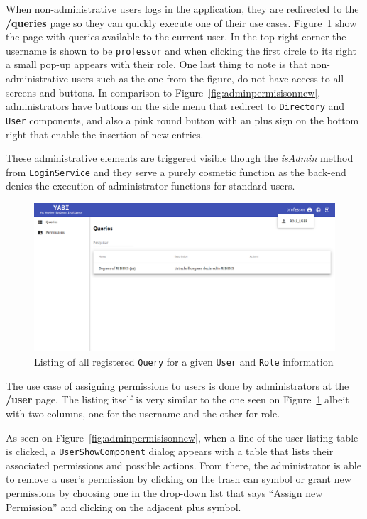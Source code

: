 When non-administrative users logs in the application, they are redirected to the \textbf{/queries} page so they can quickly execute one of their use cases. Figure~\ref{fig:userquerylist} show the page with queries available to the current user. In the top right corner the username is shown to be \texttt{professor} and when clicking the first circle to its right a small pop-up appears with their role. One last thing to note is that non-administrative users such as the one from the figure, do not have access to all screens and buttons. In comparison to Figure~\ref{fig:adminpermisisonnew}, administrators have buttons on the side menu that redirect to \texttt{Directory} and \texttt{User} components, and also a pink round button with an plus sign on the bottom right that enable the insertion of new entries.

These administrative elements are triggered visible though the \textit{isAdmin} method from \texttt{LoginService} and they serve a purely cosmetic function as the back-end denies the execution of administrator functions for standard users.

\begin{figure}
  \centering
  \includegraphics[width=.8\textwidth]{images/screenshots/user/user-query-listing-and-role}
  \caption{Listing of all registered \texttt{Query} for a given \texttt{User} and \texttt{Role} information}\label{fig:userquerylist}
\end{figure}

The use case of assigning permissions to users is done by administrators at the \textbf{/user} page. The listing itself is very similar to the one seen on Figure~\ref{fig:userquerylist} albeit with two columns, one for the username and the other for role.

As seen on Figure~\ref{fig:adminpermisisonnew}, when a line of the user listing table is clicked, a \texttt{UserShowComponent} dialog appears with a table that lists their associated permissions and possible actions. From there, the administrator is able to remove a user's permission by clicking on the trash can symbol or grant new permissions by choosing one in the drop-down list that says ``Assign new Permission'' and clicking on the adjacent plus symbol.

